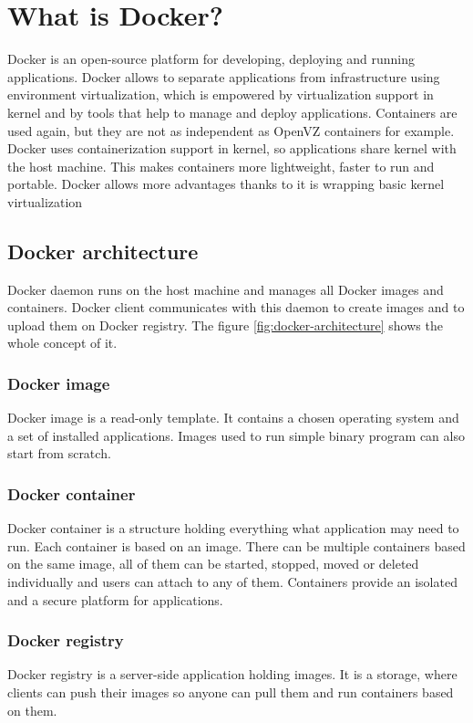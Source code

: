 \chapter{What is Docker?}
Docker is an open-source platform for developing, deploying and running applications. Docker allows to separate applications from infrastructure using environment virtualization, which is empowered by virtualization support  in kernel and by tools that help to manage and deploy applications. Containers are used again, but they are not as independent as OpenVZ containers for example. Docker uses containerization support in kernel, so applications share kernel with the host machine. This makes containers more lightweight, faster to run and portable. Docker allows more advantages thanks to it is wrapping basic kernel virtualization

\section{Docker architecture}
Docker daemon runs on the host machine and manages all Docker images and containers. Docker client communicates with this daemon to create images and to upload them on Docker registry. The figure \ref{fig:docker-architecture} shows the whole concept of it.

\subsection{Docker image}
Docker image is a read-only template. It contains a chosen operating system and a set of installed applications. Images used to run simple binary program can also start from scratch.

\subsection{Docker container}
Docker container is a structure holding everything what application may need to run. Each container is based on an image. There can be multiple containers based on the same image, all of them can be started, stopped, moved or deleted individually and users can attach to any of them. Containers provide an isolated and a secure platform for applications.

\subsection{Docker registry}
Docker registry is a server-side application holding images. It is a storage, where clients can push their images so anyone can pull them and run containers based on them.

